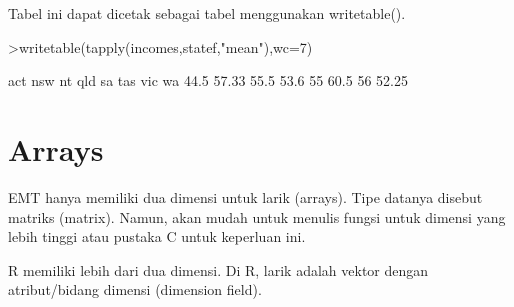 \documentclass{article}
\newenvironment{eulernotebook}{\par}{\par}
\newcommand{\eulerheading}[1]{\section{#1}}
\newenvironment{eulercomment}{\par\medskip}{\par\medskip}
\begin{document}
\begin{eulernotebook}
\begin{eulercomment}
\begin{eulercomment}
\begin{eulercomment}
\begin{eulercomment}
\begin{eulercomment}
Tabel ini dapat dicetak sebagai tabel menggunakan writetable().
\end{eulercomment}
\begin{eulerprompt}
>writetable(tapply(incomes,statef,"mean"),wc=7)
\end{eulerprompt}
\begin{euleroutput}
      act    nsw     nt    qld     sa    tas    vic     wa
     44.5  57.33   55.5   53.6     55   60.5     56  52.25
\end{euleroutput}
\eulerheading{Arrays}
\begin{eulercomment}
EMT hanya memiliki dua dimensi untuk larik (arrays). Tipe datanya
disebut matriks (matrix). Namun, akan mudah untuk menulis fungsi untuk
dimensi yang lebih tinggi atau pustaka C untuk keperluan ini.

R memiliki lebih dari dua dimensi. Di R, larik adalah vektor dengan
atribut/bidang dimensi (dimension field).


\end{eulercomment}
\end{eulercomment}
\end{eulercomment}
\end{eulercomment}
\end{eulercomment}
\end{eulernotebook}
\end{document}
